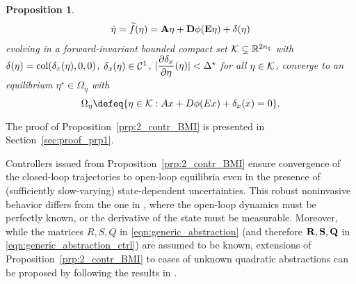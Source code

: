 \documentclass{ifacconf}
\newtheorem{proposition}{Proposition}
\begin{document}
\begin{proposition}
\begin{equation}
\begin{array}{rl}
        \label{eqn:nonlin_sys_closed_loop_pert}
        \dot \eta= \widetilde f(\eta) ={\bf{A}} \eta + {\bf{D}}\phi({\bf{E}}\eta)+ \delta(\eta)
    \end{array}
\end{equation} 
evolving in a forward-invariant bounded compact set ${\mathcal{K}}\subsetneq {\mathbb{R}}^{2 n_\xi}$ with  $\delta(\eta)=\operatorname{col}(\delta_x(\eta),0,0)$,  $\delta_x(\eta)\in {\mathcal{C}}^1$, $|\dfrac{\partial \delta_x}{\partial \eta}(\eta)|<\Delta^\star$  for all $\eta \in {\mathcal{K}}$,
converge to an equilibrium $\eta^\star\in \Omega_\eta$ with
    \begin{equation}
        \label{eqn:closed_loop_eq_set}
        \Omega_\eta \defeq \{\eta\in\cK: Ax+D\phi(E x) + \delta_x(x)= 0\}.
    \end{equation}
\end{proposition}
The proof of Proposition~\ref{prp:2_contr_BMI} is presented in Section~\ref{sec:proof_prp1}.

Controllers issued from Proposition~\ref{prp:2_contr_BMI} ensure convergence of the closed-loop trajectories to open-loop equilibria  even in the presence of (sufficiently slow-varying) state-dependent uncertainties. This robust noninvasive behavior differs from the one in \citep{ANGELI2024152}, where the open-loop dynamics must be perfectly known, or the derivative of the state must be measurable.  Moreover, while the matrices $R,S,Q$ in \eqref{eqn:generic_abstraction} (and therefore ${\bf{R}},{\bf{S}},{\bf{Q}}$ in \eqref{eqn:generic_abstraction_ctrl}) are assumed to be known, extensions of Proposition~\ref{prp:2_contr_BMI} to cases of unknown quadratic abstractions can be proposed by following the results in \citep[Section 2]{zoboli2024dynamic}. 
\end{document}

